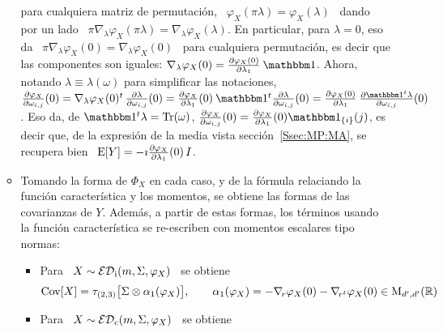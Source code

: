 \begin{itemize}
\begin{itemize}
    para  cualquiera  matriz  de  permutaci\'on,  \  $\varphi_X(\pi  \lambda)  =
    \varphi_X(\lambda)$ \ dando por un lado \ $\pi \nabla_\lambda \varphi_X (\pi
    \lambda) = \nabla_\lambda \varphi_X(\lambda)$.  En particular, para $\lambda
    = 0$, eso da \  $\pi \nabla_\lambda \varphi_X (0) = \nabla_\lambda \varphi_X
    (0)$  \ para  cualquiera permutaci\'on,  es  decir que  las componentes  son
    iguales:     $\nabla_\lambda      \varphi_X     (0)     =     \frac{\partial
      \varphi_X(0)}{\partial \lambda_1} \: \un$.  Ahora, notando $\lambda \equiv
    \lambda(\omega)$   para  simplificar   las   notaciones,  $   \frac{\partial
      \varphi_X}{\partial  \omega_{i,j}}(0) =  \nabla_\lambda  \varphi_X(0)^t \,
    \frac{\partial    \lambda}{\partial   \omega_{i,j}}(0)    =   \frac{\partial
      \varphi_X}{\partial     \lambda_1}(0)      \:     \un^t     \frac{\partial
      \lambda}{\partial \omega_{i,j}}(0) = \frac{\partial \varphi_X(0)}{\partial
      \lambda_1}  \: \frac{\partial  \un^t  \lambda}{\partial \omega_{i,j}}(0)$.
    Eso    da,    de   $\un^t    \lambda    =   \Tr(\omega)$,    $\frac{\partial
      \varphi_X}{\partial \omega_{i,j}}(0)  = \frac{\partial \varphi_X}{\partial
      \lambda_1}(0) \un_{\{i\}}(j)$, es decir que, de la expresi\'on de la media
    vista  secci\'on~\ref{Ssec:MP:MA}, se recupera  bien \  $\operatorname{E}[Y] =  - \imath
    \frac{\partial \varphi_X}{\partial \lambda_1}(0) \, I$.
  \item Tomando la forma de $\Phi_X$ en cada caso, y de la f\'ormula relaciando la
    funci\'on  caracter\'istica y  los momentos,  se obtiene  las formas  de las
    covarianzas de $Y$. Adem\'as, a  partir de estas formas, los t\'erminos usando
    la  funci\'on caracter\'istica  se re-escriben  con momentos  escalares tipo
    normas:
  \begin{itemize}
  \item Para \ $X \sim \mathcal{ED}_{\mathrm{i}}(m,\Sigma,\varphi_X)$ \ se obtiene
  \[
  \operatorname{Cov}[X] = \tau_{(2,3)} \big[  \Sigma \otimes \alpha_1(\varphi_X) \big], \qquad
  \alpha_1(\varphi_X) = - \nabla_{\! r}  \varphi_X(0) - \nabla_{\! r^t} \varphi_X(0) \in
  \mathrm{M}_{d',d'}(\mathbb{R})
  \]
  \item Para \ $X \sim \mathcal{ED}_{\mathrm{c}}(m,\Sigma,\varphi_X)$ \ se obtiene

\end{itemize}
\end{itemize}
\end{itemize}
